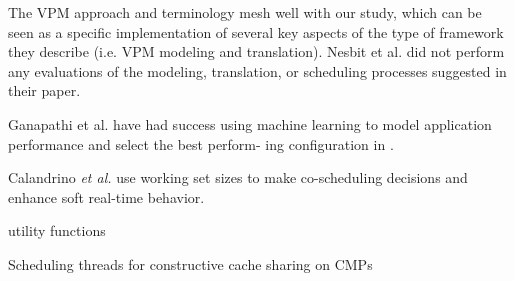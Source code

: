 The VPM approach and terminology mesh well with our study, which can be seen as a specific implementation of several key aspects of the type of framework they describe (i.e. VPM modeling and translation). Nesbit et al. did not perform any evaluations of the modeling, translation, or scheduling processes suggested in their paper.

\cite{aiken-mspc06}
\cite{1006707}
\cite{genbrugge-isca07}
\cite{merkel-eurosys08}

Ganapathi et al. have had success using machine learning to model application performance and select the best perform- ing configuration in \cite{Archana}.

Calandrino \emph{et al.}\cite{unc} use working set sizes to make co-scheduling decisions and enhance soft real-time behavior.

\cite{1078411}
utility functions

\cite{1380585,975344,wasserman-book}


Scheduling threads for constructive cache sharing on CMPs
\cite{1248396}
